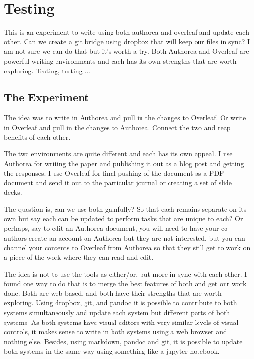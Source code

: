 \section{Testing}

This is an experiment to write using both authorea and overleaf and update each other. Can we create a git bridge using dropbox that will keep our files in sync? I am not sure we can do that but it's worth a try. Both Authorea and Overleaf are powerful writing environments and each has its own strengths that are worth exploring. 
Testing, testing ...

\subsection{The Experiment}

The idea was to write in Authorea and pull in the changes to Overleaf.
Or write in Overleaf and pull in the changes to Authorea. 
Connect the two and reap benefits of each other. 

The two environments are quite different and each has its own appeal. I use Authorea for writing the paper and publishing it out as a blog post and getting the responses. I use Overleaf for final pushing of the document as a PDF document and send it out to the particular journal or creating a set of slide decks. 

The question is, can we use both gainfully? So that each remains separate on its own but say each can be updated to perform tasks that are unique to each? Or perhaps, say to edit an Authorea document, you will need to have your co-authors create an account on Authorea but they are not interested, but you can channel your contents to Overleaf from Authorea so that they still get to work on a piece of the work where they can read and edit. 

The idea is not to use the tools as either/or, but more in sync with each other. I found one way to do that is to merge the best features of both and get our work done. Both are web based, and both have their strengths that are worth exploring. Using dropbox, git, and pandoc it is possible to contribute to both systems simultaneously and update each system but different parts of both systems. As both systems have visual editors with very similar levels of visual controls, it makes sense to write in both systems using a web browser and nothing else. Besides, using markdown, pandoc and git, it is possible to update both systems in the same way using something like a jupyter notebook. 


